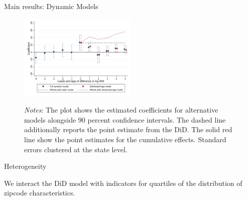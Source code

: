 \documentclass[ignorenonframetext,aspectratio=169]{beamer}
\begin{document}
\begin{frame}{Main results: Dynamic Models}
\protect\hypertarget{main-results-dynamic-models}{}

\begin{figure}
    \centering
    \includegraphics[width = 0.5\textwidth]{../../analysis/first_differences/output/fd_models.png}
    \begin{minipage}{0.9\textwidth} \footnotesize
        \vspace{2mm} 
        \textit{Notes}: The plot shows the estimated coefficients for alternative models 
        alongside 90 percent confidence intervals. The dashed line additionally reports 
        the point estimate from the DiD. The solid red line show the point 
        estimates for the cumulative effects. Standard errors clustered at the state level.
    \end{minipage}
\end{figure}

\end{frame}

\begin{frame}{Heterogeneity}
\protect\hypertarget{heterogeneity}{}

We interact the DiD model with indicators for quartiles of the
distribution of zipcode characteristics.

\begin{table}[h!]
    \centering
    \resizebox{0.8\textwidth}{!}{
        \vspace{0pt}    
        
    }
\end{table}

\end{frame}
\end{document}

